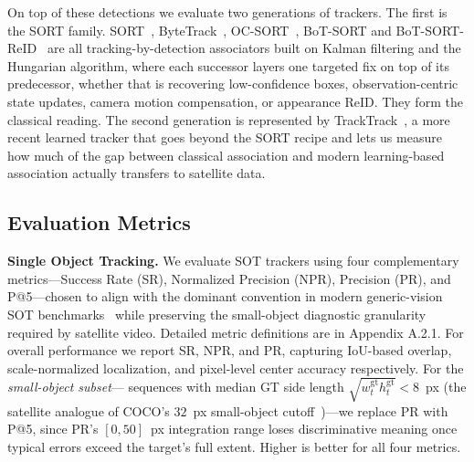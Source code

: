 \documentclass{article}
\newcommand{\subhead}[1]{\noindent\textbf{#1.}}
\begin{document}
On top of these detections we evaluate two generations of trackers. The
first is the SORT family. SORT~\citep{bewley2016sort},
ByteTrack~\citep{zhang2022bytetrack}, OC-SORT~\citep{cao2023ocsort},
BoT-SORT and BoT-SORT-ReID~\citep{aharon2022botsort} are all
tracking-by-detection associators built on Kalman filtering and the
Hungarian algorithm, where each successor layers one targeted fix on top
of its predecessor, whether that is recovering low-confidence boxes,
observation-centric state updates, camera motion compensation, or
appearance ReID. They form the classical reading. The second generation
is represented by TrackTrack~\citep{kim2025tracktrack}, a more recent
learned tracker that goes beyond the SORT recipe and lets us measure how
much of the gap between classical association and modern learning-based
association actually transfers to satellite data.

\subsection{Evaluation Metrics}
\subhead{Single Object Tracking}
We evaluate SOT trackers using four complementary metrics---Success Rate
(SR), Normalized Precision (NPR), Precision (PR), and P@5---chosen to align
with the dominant convention in modern generic-vision SOT
benchmarks~\citep{muller2018trackingnet,fan2019lasot,huang2021got10k} while
preserving the small-object diagnostic granularity required by satellite
video. Detailed metric definitions are in Appendix A.2.1. For overall
performance we report SR, NPR, and PR, capturing IoU-based overlap,
scale-normalized localization, and
pixel-level center accuracy respectively. For the \emph{small-object subset}---%
sequences with median GT side length $\sqrt{w_t^{\mathrm{gt}} h_t^{\mathrm{gt}}} < 8$~px
(the satellite analogue of COCO's $32$~px small-object
cutoff~\citep{lin2014coco})---we replace PR with P@5, since PR's $[0,50]$~px
integration range loses discriminative meaning once typical errors exceed the
target's full extent. Higher is better for all four metrics.
\end{document}
